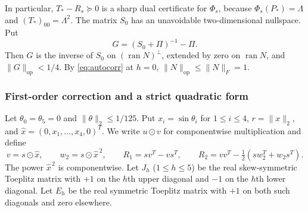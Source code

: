 \documentclass[11pt]{article}
\newcommand{\ran}{\operatorname{ran}}
\newcommand{\Op}{\mathrm{op}}
\begin{document}
In particular, $T_*-R_s\succeq0$ is a sharp dual certificate for $\Phi_s$, because $\Phi_s(P_*)=\Lambda$ and $(T_*)_{00}=\Lambda^2$. The matrix $S_0$ has an unavoidable two-dimensional nullspace. Put
\begin{equation}\label{eq:G}
 G=(S_0+\Pi)^{-1}-\Pi.
\end{equation}
Then $G$ is the inverse of $S_0$ on $(\ran N)^\perp$, extended by zero on $\ran N$, and $\|G\|_\Op<1/4$. By \eqref{eq:autocorr} at $h=0$, $\|N\|_\Op\le\|N\|_F=1$.

\subsubsection{First-order correction and a strict quadratic form}

Let $\theta_0=\theta_5=0$ and $\|\theta\|_2\le1/125$. Put $x_i=\sin\theta_i$ for $1\le i\le4$, $r=\|x\|_2$, and $\widehat x=(0,x_1,\ldots,x_4,0)^T$. We write $u\odot v$ for componentwise multiplication and define
\begin{equation}\label{eq:R123}
 v=s\odot\widehat x,\qquad w_2=s\odot\widehat x^{\,2},\qquad
 R_1=sv^T-vs^T,\qquad
 R_2=vv^T-\tfrac12(sw_2^T+w_2s^T).
\end{equation}
The power $\widehat x^{\,2}$ is componentwise. Let $J_h$ ($1\le h\le5$) be the real skew-symmetric Toeplitz matrix with $+1$ on the $h$th upper diagonal and $-1$ on the $h$th lower diagonal. Let $E_h$ be the real symmetric Toeplitz matrix with $+1$ on both such diagonals and zero elsewhere.
\end{document}
